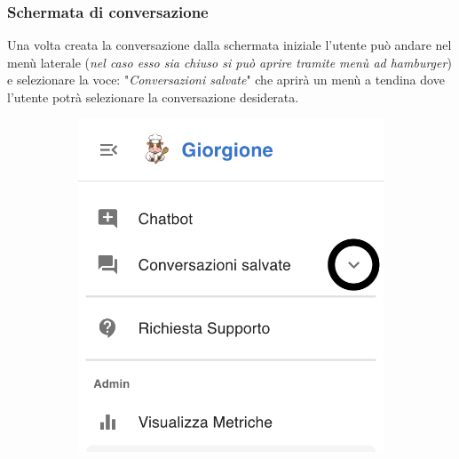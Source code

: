 \subsubsection{Schermata di conversazione}
Una volta creata la conversazione dalla schermata iniziale l'utente può andare nel menù laterale (\textit{nel caso esso sia chiuso si può aprire tramite menù ad hamburger}) e selezionare la voce: "\textit{Conversazioni salvate}" che aprirà un menù a tendina dove l'utente potrà selezionare la conversazione desiderata.
\begin{figure}[h!]
    \centering
    \begin{subfigure}{0.3\textwidth}
        \centering
        \includegraphics[width=\textwidth]{./img/laterale1.png}
    \end{subfigure}
    \hspace{0.05\textwidth}
    \begin{subfigure}{0.3\textwidth}
        \centering

\end{subfigure}
\end{figure}
